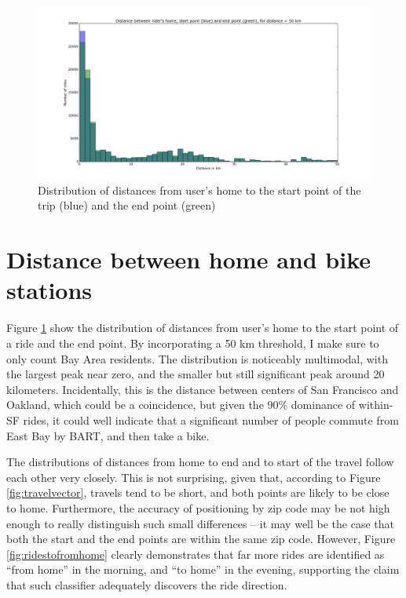 \documentclass{article}
\begin{document}
\begin{figure}
	\centering
	\includegraphics[width=\textwidth]{../start_end_home.png}
	\caption{Distribution of distances from user's home to the start point of the trip (blue) and the end point (green)}
	\label{fig:startendhome}
\end{figure}

\section{Distance between home and bike stations}

Figure \ref{fig:startendhome} show the distribution of distances from user's home to the start point of a ride and the end point. By incorporating a 50 km threshold, I make sure to only count Bay Area residents. The distribution is noticeably multimodal, with the largest peak near zero, and the smaller but still significant peak around 20 kilometers. Incidentally, this is the distance between centers of San Francisco and Oakland, which could be a coincidence, but given the 90\% dominance of within-SF rides, it could well indicate that a significant number of people commute from East Bay by BART, and then take a bike.

The distributions of distances from home to end and to start of the travel follow each other very closely. This is not surprising, given that, according to Figure \ref{fig:travelvector}, travels tend to be short, and both points are likely to be close to home. Furthermore, the accuracy of positioning by zip code may be not high enough to really distinguish such small differences -- it may well be the case that both the start and the end points are within the same zip code. However, Figure \ref{fig:ridestofromhome} clearly demonstrates that far more rides are identified as ``from home'' in the morning, and ``to home'' in the evening, supporting the claim that such classifier adequately discovers the ride direction.
\end{document}

